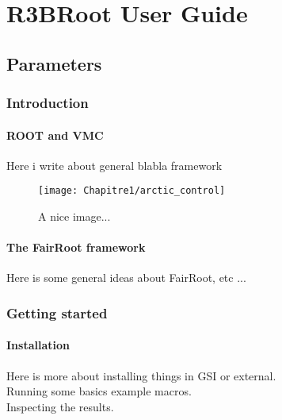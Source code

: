 \part{ R3BRoot User Guide }
\chapter{Parameters }
\label{chap:intro}
\minitoc

\section{ Introduction}

\subsection{ ROOT and VMC  }

Here i write about general blabla framework

\begin{figure}[!htbp]
  \begin{center}
    \texttt{[image: Chapitre1/arctic\_control]}
  \end{center}
  \caption{A nice image...}
  \label{fig:jolieImage}
\end{figure}

\subsection{ The FairRoot framework }

Here is some general ideas about FairRoot, etc ... 


\section{Getting started}

\subsection{ Installation }

Here is more about installing things in GSI 
or external. \\
Running some basics example macros. \\  
Inspecting the results. \\



